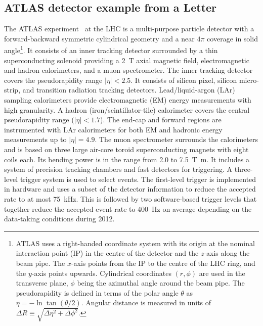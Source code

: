 \newcommand{\AtlasCoordFootnote}{%
ATLAS uses a right-handed coordinate system with its origin at the nominal interaction point (IP)
in the centre of the detector and the $z$-axis along the beam pipe.
The $x$-axis points from the IP to the centre of the LHC ring,
and the $y$-axis points upwards.
Cylindrical coordinates $(r,\phi)$ are used in the transverse plane, 
$\phi$ being the azimuthal angle around the beam pipe.
The pseudorapidity is defined in terms of the polar angle $\theta$ as $\eta = -\ln \tan(\theta/2)$.
Angular distance is measured in units of $\Delta R \equiv \sqrt{\Delta\eta^{2} + \Delta\phi^{2}}$.}

\subsection{ATLAS detector example from a Letter}
\label{sec:atlas1}

The ATLAS experiment~\cite{atlas-detector} at the LHC is a multi-purpose particle detector
with a forward-backward symmetric cylindrical geometry and a near $4\pi$ coverage in 
solid angle\footnote{\AtlasCoordFootnote}.
It consists of an inner tracking detector surrounded by a thin superconducting solenoid
providing a \SI{2}{\tesla} axial magnetic field, electromagnetic and hadron calorimeters, and a muon spectrometer.
The inner tracking detector covers the pseudorapidity range $|\eta| < 2.5$.
It consists of silicon pixel, silicon micro-strip, and transition radiation tracking detectors.
Lead/liquid-argon (LAr) sampling calorimeters provide electromagnetic (EM) energy measurements
with high granularity.
A hadron (iron/scintillator-tile) calorimeter covers the central pseudorapidity range ($|\eta| < 1.7$).
The end-cap and forward regions are instrumented with LAr calorimeters
for both EM and hadronic energy measurements up to $|\eta| = 4.9$.
The muon spectrometer surrounds the calorimeters and is based on
three large air-core toroid superconducting magnets with eight coils each.
Its bending power is in the range from \num{2.0} to \SI{7.5}{\tesla\metre}.
It includes a system of precision tracking chambers and fast detectors for triggering.
A three-level trigger system is used to select events.
The first-level trigger is implemented in hardware and uses a subset of the detector information
to reduce the accepted rate to at most \SI{75}{\kilo\hertz}.
This is followed by two software-based trigger levels that
together reduce the accepted event rate to \SI{400}{\hertz} on average
depending on the data-taking conditions during 2012.


